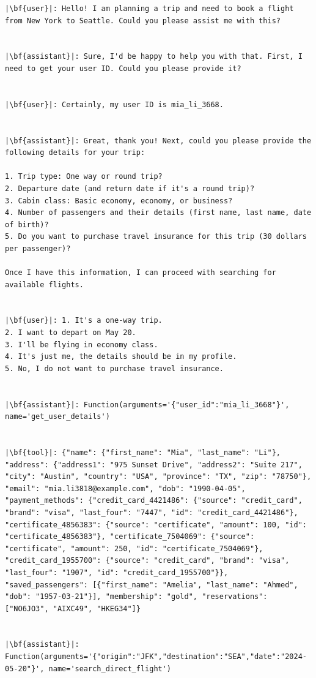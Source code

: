 \begin{verbatim}
|\bf{user}|: Hello! I am planning a trip and need to book a flight from New York to Seattle. Could you please assist me with this?


|\bf{assistant}|: Sure, I'd be happy to help you with that. First, I need to get your user ID. Could you please provide it?


|\bf{user}|: Certainly, my user ID is mia_li_3668.


|\bf{assistant}|: Great, thank you! Next, could you please provide the following details for your trip:

1. Trip type: One way or round trip?
2. Departure date (and return date if it's a round trip)?
3. Cabin class: Basic economy, economy, or business?
4. Number of passengers and their details (first name, last name, date of birth)?
5. Do you want to purchase travel insurance for this trip (30 dollars per passenger)?

Once I have this information, I can proceed with searching for available flights.


|\bf{user}|: 1. It's a one-way trip.
2. I want to depart on May 20.
3. I'll be flying in economy class.
4. It's just me, the details should be in my profile.
5. No, I do not want to purchase travel insurance.


|\bf{assistant}|: Function(arguments='{"user_id":"mia_li_3668"}', name='get_user_details')


|\bf{tool}|: {"name": {"first_name": "Mia", "last_name": "Li"}, "address": {"address1": "975 Sunset Drive", "address2": "Suite 217", "city": "Austin", "country": "USA", "province": "TX", "zip": "78750"}, "email": "mia.li3818@example.com", "dob": "1990-04-05", "payment_methods": {"credit_card_4421486": {"source": "credit_card", "brand": "visa", "last_four": "7447", "id": "credit_card_4421486"}, "certificate_4856383": {"source": "certificate", "amount": 100, "id": "certificate_4856383"}, "certificate_7504069": {"source": "certificate", "amount": 250, "id": "certificate_7504069"}, "credit_card_1955700": {"source": "credit_card", "brand": "visa", "last_four": "1907", "id": "credit_card_1955700"}}, "saved_passengers": [{"first_name": "Amelia", "last_name": "Ahmed", "dob": "1957-03-21"}], "membership": "gold", "reservations": ["NO6JO3", "AIXC49", "HKEG34"]}


|\bf{assistant}|: Function(arguments='{"origin":"JFK","destination":"SEA","date":"2024-05-20"}', name='search_direct_flight')



\end{verbatim}
